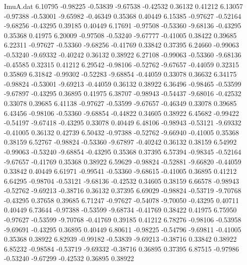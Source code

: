 \begin{filecontents}{ImuA.dat}
   6.10795   -0.98225   -0.53839   -9.67538   -0.42532    0.36132    0.41212
   6.13057   -0.97388   -0.53001   -9.65982   -0.46349    0.35368    0.40449
   6.15385   -0.97627   -0.52164   -9.68256   -0.43295    0.39185    0.40449
   6.17691   -0.97508   -0.53360   -9.68136   -0.43295    0.35368    0.41975
   6.20009   -0.97508   -0.53240   -9.67777   -0.41005    0.38422    0.39685
   6.22311   -0.97627   -0.53360   -9.68256   -0.41769    0.33842    0.37395
   6.24660   -0.99063   -0.53240   -9.69332   -0.40242    0.36132    0.38922
   6.27108   -0.99063   -0.53360   -9.68136   -0.45585    0.32315    0.41212
   6.29542   -0.98106   -0.52762   -9.67657   -0.44059    0.32315    0.35869
   6.31842   -0.99302   -0.52283   -9.68854   -0.44059    0.33078    0.36632
   6.34175   -0.98824   -0.53001   -9.69213   -0.44059    0.36132    0.38922
   6.36496   -0.98465   -0.53599   -9.67897   -0.43295    0.36895    0.41975
   6.38707   -0.98943   -0.54437   -9.68016   -0.42532    0.33078    0.39685
   6.41138   -0.97627   -0.53599   -9.67657   -0.46349    0.33078    0.39685
   6.43456   -0.98106   -0.53360   -9.68854   -0.44822    0.34605    0.38922
   6.45682   -0.99422   -0.54197   -9.67418   -0.43295    0.33078    0.40449
   6.48106   -0.98943   -0.53121   -9.69332   -0.41005    0.36132    0.42739
   6.50432   -0.97388   -0.52762   -9.66940   -0.41005    0.35368    0.38159
   6.52767   -0.98824   -0.53360   -9.67897   -0.40242    0.36132    0.38159
   6.54992   -0.99063   -0.53240   -9.68854   -0.43295    0.35368    0.37395
   6.57394   -0.98345   -0.52164   -9.67657   -0.41769    0.35368    0.38922
   6.59629   -0.98824   -0.52881   -9.66820   -0.44059    0.33842    0.40449
   6.61971   -0.99541   -0.53360   -9.68615   -0.41005    0.36895    0.41212
   6.64295   -0.98704   -0.53121   -9.68136   -0.42532    0.34605    0.38159
   6.66578   -0.98943   -0.52762   -9.69213   -0.38716    0.36132    0.37395
   6.69029   -0.98824   -0.53719   -9.70768   -0.43295    0.37658    0.39685
   6.71247   -0.97627   -0.54078   -9.70050   -0.43295    0.40711    0.40449
   6.73644   -0.97388   -0.53599   -9.68734   -0.41769    0.38422    0.41975
   6.75950   -0.97627   -0.53599   -9.70768   -0.41769    0.39185    0.41212
   6.78276   -0.98106   -0.53958   -9.69691   -0.43295    0.36895    0.40449
   6.80611   -0.98225   -0.54796   -9.69811   -0.41005    0.35368    0.38922
   6.82939   -0.99182   -0.53839   -9.69213   -0.38716    0.33842    0.38922
   6.85232   -0.98584   -0.53719   -9.69332   -0.38716    0.36895    0.37395
   6.87515   -0.97986   -0.53240   -9.67299   -0.42532    0.36895    0.38922

\end{filecontents}
